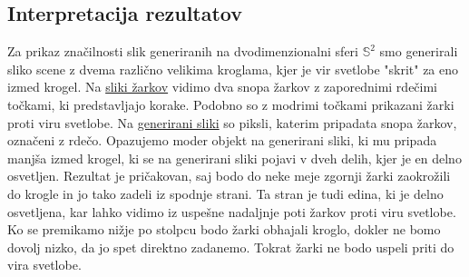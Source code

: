 \documentclass[titlepage]{article}
\begin{document}
\subsection{Interpretacija rezultatov}
Za prikaz značilnosti slik generiranih na dvodimenzionalni sferi $\mathbb{S}^{2}$ smo generirali sliko scene z dvema različno velikima kroglama, kjer je 
vir svetlobe "skrit" za eno izmed krogel. Na \hyperref[fig:2sphRays]{sliki žarkov} vidimo dva snopa žarkov z zaporednimi rdečimi točkami, ki predstavljajo korake. Podobno so z modrimi točkami prikazani žarki proti viru svetlobe. Na \hyperref[fig:2sphRend]{generirani sliki} so piksli, katerim pripadata snopa žarkov, označeni z rdečo. Opazujemo moder objekt na generirani sliki, ki mu pripada manjša izmed krogel, ki se na generirani sliki pojavi v dveh delih, kjer je en delno osvetljen. Rezultat je pričakovan, saj bodo do neke meje zgornji žarki zaokrožili do krogle in jo tako zadeli iz spodnje strani. Ta stran je tudi edina, ki je delno osvetljena, kar lahko vidimo iz uspešne nadaljnje poti žarkov proti viru svetlobe. Ko se premikamo nižje po stolpcu bodo žarki obhajali kroglo, dokler ne bomo dovolj nizko, da jo spet direktno zadanemo. Tokrat žarki ne bodo uspeli priti do vira svetlobe.
\end{document}
